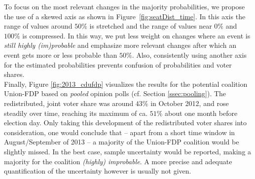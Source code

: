 \documentclass[smallcondensed]{svjour3}     %
\begin{document}
To focus on the most relevant changes in the majority probabilities, we propose
the use of a skewed axis as shown in Figure~\ref{fig:seatDist_time}. In this axis
the range of values around $50\%$ is stretched and the range of values near
$0\%$ and $100\%$ is compressed. In this way, we put less weight on changes
where an event is {\it still highly (im)probable} and emphasize more relevant
changes after which an event gets more or less probable than $50\%$. Also,
consistently using another axis for the estimated probabilities prevents
confusion of probabilities and voter shares.\\

Finally, Figure \ref{fig:2013_cdufdp} visualizes the results for the potential
coalition Union-FDP based on \emph{pooled} opinion polls (cf. Section \ref{ssec:pooling}).
The redistributed, joint voter share was around $43\%$ in October 2012,
and rose steadily over time, reaching its maximum of ca. $51\%$ about one month
before election day.
Only taking this development of the redistributed voter shares into
consideration, one would conclude that -- apart from a short
time window in August/September of 2013 -- a majority of the Union-FDP
coalition would be slightly missed.
In the best case, sample uncertainty would be reported, making
a majority for the coalition {\it (highly) improbable}. A more
precise and adequate quantification of the uncertainty however is usually not given.
\end{document}
